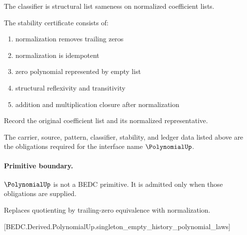 \begin{definition}
\label{def:polynomial-classifier-specification}
The classifier is structural list sameness on normalized coefficient lists.
\end{definition}

\begin{definition}
\label{def:polynomial-stability-certificate}
The stability certificate consists of:
\begin{enumerate}
  \item normalization removes trailing zeros
  \item normalization is idempotent
  \item zero polynomial represented by empty list
  \item structural reflexivity and transitivity
  \item addition and multiplication closure after normalization
\end{enumerate}
\end{definition}

\begin{definition}
\label{def:polynomial-ledger-policy}
Record the original coefficient list and its normalized representative.
\end{definition}

\begin{definition}
\label{def:polynomial-certificate-obligations}
The carrier, source, pattern, classifier, stability, and ledger data listed above are the obligations required for the interface name \(\PolynomialUp\).
\end{definition}

\paragraph{Primitive boundary.}
\(\PolynomialUp\) is not a BEDC primitive. It is admitted only when those obligations are supplied.

\begin{remark}
\label{rem:polynomial-zero-axiom-note}
Replaces quotienting by trailing-zero equivalence with normalization.
\end{remark}

[BEDC.Derived.PolynomialUp.singleton\_empty\_history\_polynomial\_laws]

